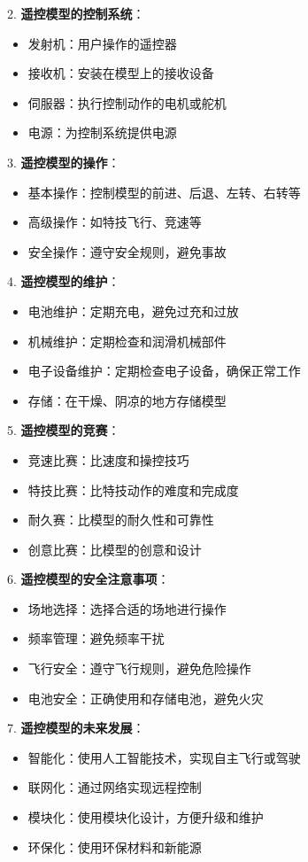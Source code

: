 \documentclass[12pt,UTF8]{ctexbook}
\begin{document}
2. \textbf{遥控模型的控制系统}：
   \begin{itemize}[leftmargin=3.5em]
   \item 发射机：用户操作的遥控器
   \item 接收机：安装在模型上的接收设备
   \item 伺服器：执行控制动作的电机或舵机
   \item 电源：为控制系统提供电源
   \end{itemize}

3. \textbf{遥控模型的操作}：
   \begin{itemize}[leftmargin=3.5em]
   \item 基本操作：控制模型的前进、后退、左转、右转等
   \item 高级操作：如特技飞行、竞速等
   \item 安全操作：遵守安全规则，避免事故
   \end{itemize}

4. \textbf{遥控模型的维护}：
   \begin{itemize}[leftmargin=3.5em]
   \item 电池维护：定期充电，避免过充和过放
   \item 机械维护：定期检查和润滑机械部件
   \item 电子设备维护：定期检查电子设备，确保正常工作
   \item 存储：在干燥、阴凉的地方存储模型
   \end{itemize}

5. \textbf{遥控模型的竞赛}：
   \begin{itemize}[leftmargin=3.5em]
   \item 竞速比赛：比速度和操控技巧
   \item 特技比赛：比特技动作的难度和完成度
   \item 耐久赛：比模型的耐久性和可靠性
   \item 创意比赛：比模型的创意和设计
   \end{itemize}

6. \textbf{遥控模型的安全注意事项}：
   \begin{itemize}[leftmargin=3.5em]
   \item 场地选择：选择合适的场地进行操作
   \item 频率管理：避免频率干扰
   \item 飞行安全：遵守飞行规则，避免危险操作
   \item 电池安全：正确使用和存储电池，避免火灾
   \end{itemize}

7. \textbf{遥控模型的未来发展}：
   \begin{itemize}[leftmargin=3.5em]
   \item 智能化：使用人工智能技术，实现自主飞行或驾驶
   \item 联网化：通过网络实现远程控制
   \item 模块化：使用模块化设计，方便升级和维护
   \item 环保化：使用环保材料和新能源
   \end{itemize}
\end{document}
